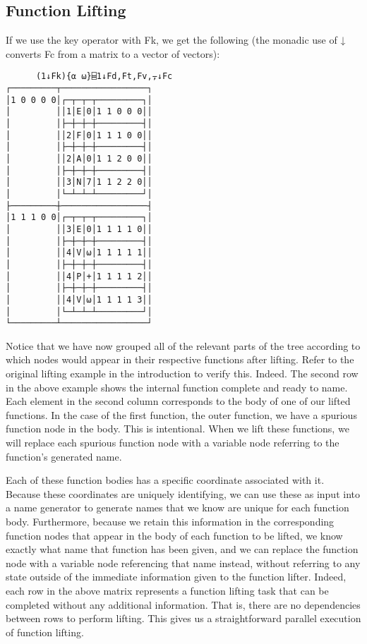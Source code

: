 \documentclass[pldi]{sigplanconf-pldi15}
\begin{document}
\subsection{Function Lifting}

If we use the key operator with Fk, we get the following (the monadic use of ↓ converts Fc from a 
matrix to a vector of vectors):

\begin{verbatim}
      (1↓Fk){⍺ ⍵}⌸1↓Fd,Ft,Fv,⍪↓Fc
┌─────────┬─────────────────┐
│1 0 0 0 0│┌─┬─┬─┬─────────┐│
│         ││1│E│0│1 1 0 0 0││
│         │├─┼─┼─┼─────────┤│
│         ││2│F│0│1 1 1 0 0││
│         │├─┼─┼─┼─────────┤│
│         ││2│A│0│1 1 2 0 0││
│         │├─┼─┼─┼─────────┤│
│         ││3│N│7│1 1 2 2 0││
│         │└─┴─┴─┴─────────┘│
├─────────┼─────────────────┤
│1 1 1 0 0│┌─┬─┬─┬─────────┐│
│         ││3│E│0│1 1 1 1 0││
│         │├─┼─┼─┼─────────┤│
│         ││4│V│⍵│1 1 1 1 1││
│         │├─┼─┼─┼─────────┤│
│         ││4│P│+│1 1 1 1 2││
│         │├─┼─┼─┼─────────┤│
│         ││4│V│⍵│1 1 1 1 3││
│         │└─┴─┴─┴─────────┘│
└─────────┴─────────────────┘
\end{verbatim}

Notice that we have now grouped all of the relevant parts of the tree according to which nodes would 
appear in their respective functions after lifting. Refer to the original lifting example in the 
introduction to verify this. Indeed. The second row in the above example shows the internal function 
complete and ready to name. Each element in the second column corresponds to the body of one of our 
lifted functions. In the case of the first function, the outer function, we have a spurious function node 
in the body. This is intentional. When we lift these functions, we will replace each spurious function 
node with a variable node referring to the function’s generated name. 

Each of these function bodies has a specific coordinate associated with it. Because these coordinates 
are uniquely identifying, we can use these as input into a name generator to generate names that we 
know are unique for each function body. Furthermore, because we retain this information in the 
corresponding function nodes that appear in the body of each function to be lifted, we know exactly what 
name that function has been given, and we can replace the function node with a variable node referencing 
that name instead, without referring to any state outside of the immediate information given to the 
function lifter. Indeed, each row in the above matrix represents a function lifting task that can be 
completed without any additional information. That is, there are no dependencies between rows to perform 
lifting. This gives us a straightforward parallel execution of function lifting. 
\end{document}
